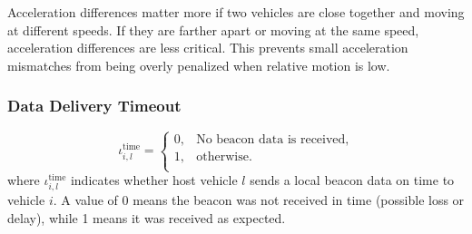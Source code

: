 \documentclass[letterpaper, 10pt, conference]{ieeeconf}  %
\begin{document}
Acceleration differences matter more if two vehicles are close together and moving at different speeds.
If they are farther apart or moving at the same speed, acceleration differences are less critical.
This prevents small acceleration mismatches from being overly penalized when relative motion is low.

\subsubsection{Data Delivery Timeout}
\begin{equation}\label{deli_timeout}
    \iota_{i,l}^{\text{time}} =\begin{cases}
        0 , &\text{No beacon data is received,} \\
        1, &\text{otherwise.}\\
    \end{cases}
\end{equation}
where $\iota_{i,l}^{\text{time}}$ indicates whether host vehicle $l$ sends a local beacon data on time to vehicle $i$. A value of 0 means the beacon was not received in time (possible loss or delay), while 1 means it was received as expected.






\end{document}
